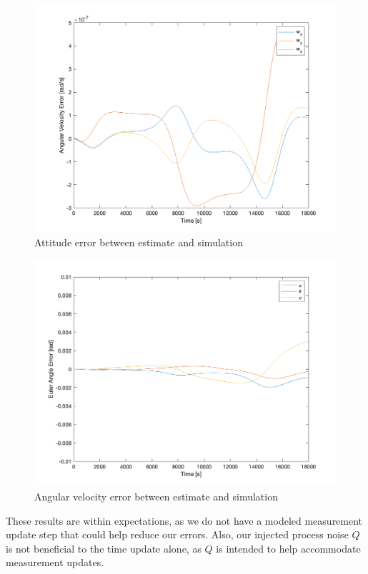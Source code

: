 \begin{figure}[H]
\centering
\includegraphics[scale=0.6]{Images/ps7_problem6_angvel_err.png}
\caption{Attitude error between estimate and simulation}
\label{fig:ps7_problem6_angvel_err}
\end{figure}

\begin{figure}[H]
\centering
\includegraphics[scale=0.6]{Images/ps7_problem6_angle_err.png}
\caption{Angular velocity error between estimate and simulation}
\label{fig:ps7_problem6_angle_err}
\end{figure}

These results are within expectations, as we do not have a modeled measurement update step that could help reduce our errors. Also, our injected process noise $Q$ is not beneficial to the time update alone, as $Q$ is intended to help accommodate measurement updates.